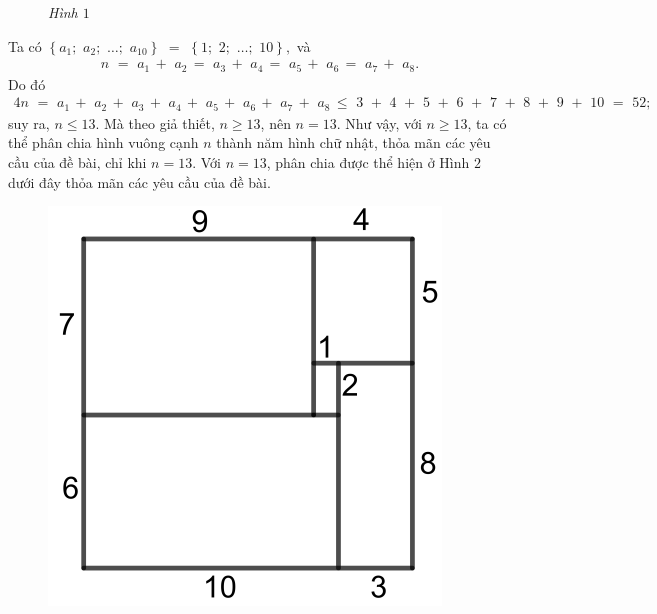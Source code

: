 \begin{multicols}{2}
\begin{figure}[H]
		\caption{\small\textit{\color{thachthuctoanhoc}Hình $1$}}
		\vspace*{-10pt}
	\end{figure}
	Ta có $\left\{ {{a_1};\,\,{a_2};\,\, \ldots ;\,\,{a_{10}}} \right\}\,\, = \,\,\left\{ {1;\,\,2;\,\, \ldots ;\,\,10} \right\},$ và
	\begin{align*}
		n\,\, = \,\,{a_1}\, + \,\,{a_2}\, = \,\,{a_3}\, + \,\,{a_4}\, = \,\,{a_5}\, + \,\,{a_6}\, = \,\,{a_7}\, + \,\,{a_8}.
	\end{align*}
	Do đó
	\begin{align*}
		4n\,\, = \,\,{a_1}\, + \,\,{a_2}\, + \,\,{a_3}\, + \,\,{a_4}\, + \,\,{a_5}\, + \,\,{a_6}\, + \,\,{a_7}\, + \,\,{a_8}\, \le \,\,3\,\, + \,\,4\,\, + \,\,5\,\, + \,\,6\,\, + \,\,7\,\, + \,\,8\,\, + \,\,9\,\, + \,\,10\,\, = \,\,52;
	\end{align*}
	suy ra, $n \le 13$. Mà theo giả thiết, $n \ge 13$, nên $n = 13$.
	\vskip 0.05cm
	Như vậy, với $n \ge 13$, ta có thể phân chia hình vuông cạnh $n$ thành năm hình chữ nhật, thỏa mãn các yêu cầu của đề bài, chỉ khi $n = 13$.
	\vskip 0.05cm
	Với $n = 13$, phân chia được thể hiện ở Hình $2$ dưới đây thỏa mãn các yêu cầu của đề bài.
	\begin{figure}[H]
		\vspace*{-5pt}
		\centering
		\captionsetup{labelformat= empty, justification=centering}
		\includegraphics[width= 1\linewidth]{P666H2}

\end{figure}
\end{multicols}
